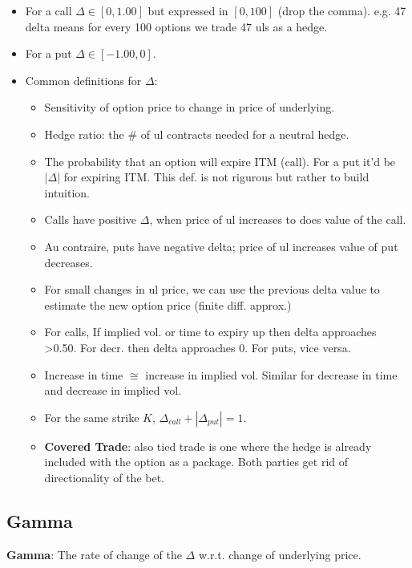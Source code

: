 \documentclass{article}
\begin{document}
\begin{itemize}
    \item For a call $\Delta \in [0, 1.00]$ but expressed in $[0,100]$ (drop the comma).
    e.g. 47 delta means for every 100 options we trade 47 uls as a hedge.
    \item For a put $\Delta \in [-1.00, 0]$.
    \item Common definitions for $\Delta$:
    \begin{itemize}
        \item Sensitivity of option price to change in price of underlying.
        \item Hedge ratio: the \# of ul contracts needed for a neutral hedge.
        \item The probability that an option will expire ITM (call). For a put
        it'd be $|\Delta|$ for expiring ITM. This def. is not rigurous but
        rather to build intuition.
        \item Calls have positive $\Delta$, when price of ul increases to does
        value of the call.
        \item Au contraire, puts have negative delta; price of ul increases
        value of put decreases.
        \item For small changes in ul price, we can use the previous delta value
        to estimate the new option price (finite diff. approx.)
        \item  For calls, If implied vol. or time to expiry up then delta
        approaches
         >0.50. For decr. then delta approaches 0. For puts, vice versa.
        \item Increase in time $\cong$ increase in implied vol. Similar for
        decrease in time and decrease in implied vol.
        \item For the same strike $K$, $\Delta_{call} + |\Delta_{put}| = 1$.
        \item \textbf{Covered Trade}: also tied trade is one where the hedge is
        already included with the option as a package. Both parties get rid of
        directionality of the bet.
    \end{itemize}
\end{itemize}

\subsection*{Gamma}
\textbf{Gamma}: The rate of change of the $\Delta$ w.r.t. change of underlying
price.
\end{document}
